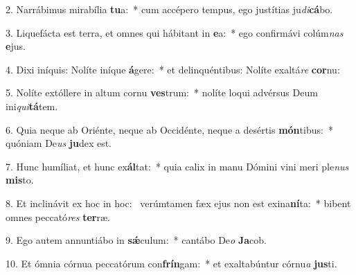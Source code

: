 2. Narrábimus mirabília \textbf{tu}a:~*  cum accépero tempus, ego justítias ju\textit{di}\textbf{cá}bo.\

3. Liquefácta est terra, et omnes qui hábitant in \textbf{e}a:~*  ego confirmávi colúm\textit{nas} \textbf{e}jus.\

4. Dixi iníquis: Nolíte iníque \textbf{á}gere:~*  et delinquéntibus: Nolíte exaltá\textit{re} \textbf{cor}nu:\

5. Nolíte extóllere in altum cornu \textbf{ves}trum:~*  nolíte loqui advérsus Deum ini\textit{qui}\textbf{tá}tem.\

6. Quia neque ab Oriénte, neque ab Occidénte, neque a desértis \textbf{món}tibus:~*  quóniam De\textit{us} \textbf{ju}dex est.\

7. Hunc humíliat, et hunc ex\textbf{ál}tat:~*  quia calix in manu Dómini vini meri ple\textit{nus} \textbf{mis}to.\

8. Et inclinávit ex hoc in hoc: \dag\  verúmtamen fæx ejus non est exina\textbf{ní}ta:~*  bibent omnes peccató\textit{res} \textbf{ter}ræ.\

9. Ego autem annuntiábo in \textbf{sǽ}culum:~*  cantábo De\textit{o} \textbf{Ja}cob.\

10. Et ómnia córnua peccatórum con\textbf{frín}gam:~*  et exaltabúntur córnu\textit{a} \textbf{jus}ti.\

